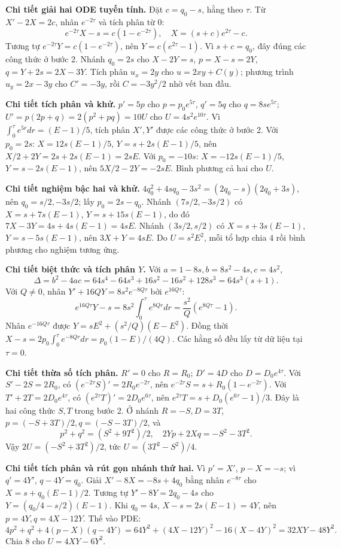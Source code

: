 \textbf{Chi tiết giải hai ODE tuyến tính.} Đặt $c=q_0-s$, hằng theo $\tau$. Từ $X'-2X=2c$, nhân $e^{-2\tau}$ và tích phân từ $0$:
\[e^{-2\tau}X-s=c(1-e^{-2\tau}),\quad X=(s+c)e^{2\tau}-c.\]
Tương tự $e^{-2\tau}Y=c(1-e^{-2\tau})$, nên $Y=c(e^{2\tau}-1)$. Vì $s+c=q_0$, đây đúng các công thức ở bước 2. Nhánh $q_0=2s$ cho $X-2Y=s$, $p=X-s=2Y$, $q=Y+2s=2X-3Y$. Tích phân $u_x=2y$ cho $u=2xy+C(y)$; phương trình $u_y=2x-3y$ cho $C'=-3y$, rồi $C=-3y^2/2$ nhờ vết ban đầu.

\textbf{Chi tiết tích phân và khử.} $p'=5p$ cho $p=p_0e^{5\tau}$, $q'=5q$ cho $q=8se^{5\tau}$; $U'=p(2p+q)=2(p^2+pq)=10U$ cho $U=4s^2e^{10\tau}$. Vì $\int_0^\tau e^{5r}dr=(E-1)/5$, tích phân $X',Y'$ được các công thức ở bước 2. Với $p_0=2s$: $X=12s(E-1)/5$, $Y=s+2s(E-1)/5$, nên $X/2+2Y=2s+2s(E-1)=2sE$. Với $p_0=-10s$: $X=-12s(E-1)/5$, $Y=s-2s(E-1)$, nên $5X/2-2Y=-2sE$. Bình phương cả hai cho $U$.

\textbf{Chi tiết nghiệm bậc hai và khử.} $4q_0^2+4sq_0-3s^2=(2q_0-s)(2q_0+3s)$, nên $q_0=s/2,-3s/2$; lấy $p_0=2s-q_0$. Nhánh $(7s/2,-3s/2)$ có $X=s+7s(E-1)$, $Y=s+15s(E-1)$, do đó $7X-3Y=4s+4s(E-1)=4sE$. Nhánh $(3s/2,s/2)$ có $X=s+3s(E-1)$, $Y=s-5s(E-1)$, nên $3X+Y=4sE$. Do $U=s^2E^2$, mỗi tổ hợp chia $4$ rồi bình phương cho nghiệm tương ứng.

\textbf{Chi tiết biệt thức và tích phân $Y$.} Với $a=1-8s,b=8s^2-4s,c=4s^2$,
\[\Delta=b^2-4ac=64s^4-64s^3+16s^2-16s^2+128s^3=64s^3(s+1).\]
Với $Q\ne0$, nhân $Y'+16QY=8s^2e^{-8Q\tau}$ bởi $e^{16Q\tau}$:
\[e^{16Q\tau}Y-s=8s^2\int_0^\tau e^{8Qr}dr=\frac{s^2}{Q}(e^{8Q\tau}-1).\]
Nhân $e^{-16Q\tau}$ được $Y=sE^2+(s^2/Q)(E-E^2)$. Đồng thời $X-s=2p_0\int_0^\tau e^{-8Qr}dr=p_0(1-E)/(4Q)$. Các hằng số đều lấy từ dữ liệu tại $\tau=0$.

\textbf{Chi tiết thừa số tích phân.} $R'=0$ cho $R=R_0$; $D'=4D$ cho $D=D_0e^{4\tau}$. Với $S'-2S=2R_0$, có $(e^{-2\tau}S)'=2R_0e^{-2\tau}$, nên $e^{-2\tau}S=s+R_0(1-e^{-2\tau})$. Với $T'+2T=2D_0e^{4\tau}$, có $(e^{2\tau}T)'=2D_0e^{6\tau}$, nên $e^{2\tau}T=s+D_0(e^{6\tau}-1)/3$. Đây là hai công thức $S,T$ trong bước 2. Ở nhánh $R=-S,D=3T$, $p=(-S+3T)/2,q=(-S-3T)/2$, và
\[p^2+q^2=(S^2+9T^2)/2,\quad 2Yp+2Xq=-S^2-3T^2.\]
Vậy $2U=(-S^2+3T^2)/2$, tức $U=(3T^2-S^2)/4$.

\textbf{Chi tiết tích phân và rút gọn nhánh thứ hai.} Vì $p'=X'$, $p-X=-s$; vì $q'=4Y'$, $q-4Y=q_0$. Giải $X'-8X=-8s+4q_0$ bằng nhân $e^{-8\tau}$ cho $X=s+q_0(E-1)/2$. Tương tự $Y'-8Y=2q_0-4s$ cho $Y=(q_0/4-s/2)(E-1)$. Khi $q_0=4s$, $X-s=2s(E-1)=4Y$, nên $p=4Y,q=4X-12Y$. Thế vào PDE:
\[4p^2+q^2+4(p-X)(q-4Y)
=64Y^2+(4X-12Y)^2-16(X-4Y)^2
=32XY-48Y^2.\]
Chia $8$ cho $U=4XY-6Y^2$.

